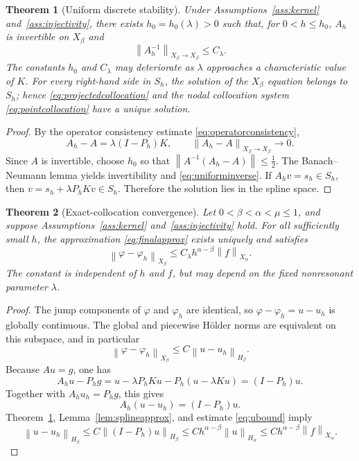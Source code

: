 \documentclass[11pt,a4paper]{amsart}
\theoremstyle{plain}
\newtheorem{theorem}{Theorem}[section]
\theoremstyle{definition}
\theoremstyle{remark}
\newcommand{\norm}[1]{\left\|#1\right\|}
\begin{document}
\begin{theorem}[Uniform discrete stability]\label{thm:discretestability}
Under Assumptions~\ref{ass:kernel} and~\ref{ass:injectivity}, there exists $h_0=h_0(\lambda)>0$ such that, for $0<h\le h_0$, $A_h$ is invertible on $X_\beta$ and
\begin{equation}\label{eq:uniforminverse}
        \norm{A_h^{-1}}_{X_\beta\to X_\beta}\le C_\lambda.
\end{equation}
The constants $h_0$ and $C_\lambda$ may deteriorate as $\lambda$ approaches a characteristic value of $K$.
For every right-hand side in $S_h$, the solution of the $X_\beta$ equation belongs to $S_h$; hence \eqref{eq:projectedcollocation} and the nodal collocation system \eqref{eq:pointcollocation} have a unique solution.
\end{theorem}

\begin{proof}
By the operator consistency estimate \eqref{eq:operatorconsistency},
\[
        A_h-A=\lambda(I-P_h)K,
        \qquad
        \norm{A_h-A}_{X_\beta\to X_\beta}\to0.
\]
Since $A$ is invertible, choose $h_0$ so that
$
        \norm{A^{-1}(A_h-A)}\le\frac12.
$
The Banach--Neumann lemma yields invertibility and \eqref{eq:uniforminverse}.  If $A_hv=s_h\in S_h$, then
$
        v=s_h+\lambda P_hKv\in S_h.
$
Therefore the solution lies in the spline space.
\end{proof}

\begin{theorem}[Exact-collocation convergence]\label{thm:exactconvergence}
Let $0<\beta<\alpha<\mu\le1$, and suppose Assumptions~\ref{ass:kernel} and~\ref{ass:injectivity} hold.  For all sufficiently small $h$, the approximation \eqref{eq:finalapprox} exists uniquely and satisfies
\begin{equation}\label{eq:mainerror}
        \norm{\varphi-\varphi_h}_{X_\beta}
        \le C_\lambda h^{\alpha-\beta}\norm{f}_{X_\alpha}.
\end{equation}
The constant is independent of $h$ and $f$, but may depend on the fixed nonresonant parameter $\lambda$.
\end{theorem}

\begin{proof}
The jump components of $\varphi$ and $\varphi_h$ are identical, so $\varphi-\varphi_h=u-u_h$ is globally continuous.  The global and piecewise H\"older norms are equivalent on this subspace, and in particular
\[
        \norm{\varphi-\varphi_h}_{X_\beta}
        \le C\norm{u-u_h}_{H_\beta}.
\]
Because $Au=g$, one has
\[
        A_hu-P_hg=u-\lambda P_hKu-P_h(u-\lambda Ku)=(I-P_h)u.
\]
Together with $A_hu_h=P_hg$, this gives
\[
        A_h(u-u_h)=(I-P_h)u.
\]
Theorem~\ref{thm:discretestability}, Lemma~\ref{lem:splineapprox}, and estimate \eqref{eq:ubound} imply
\[
        \norm{u-u_h}_{H_\beta}
        \le C\norm{(I-P_h)u}_{H_\beta}
        \le Ch^{\alpha-\beta}\norm{u}_{H_\alpha}
        \le Ch^{\alpha-\beta}\norm{f}_{X_\alpha}.
\]
\end{proof}
\end{document}
